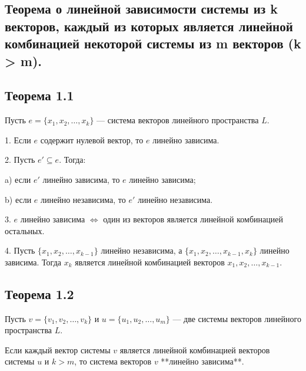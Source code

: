 {
\subsection{Теорема о линейной зависимости системы из k векторов, каждый из которых является линейной комбинацией некоторой системы из m векторов (k > m).}

\subsection*{Теорема 1.1}

Пусть \( e = \{ x_1, x_2, \ldots, x_k \} \) — система векторов линейного пространства \( L \).

1. Если \( e \) содержит нулевой вектор, то \( e \) линейно зависима.

2. Пусть \( e' \subseteq e \). Тогда:

   a) если \( e' \) линейно зависима, то \( e \) линейно зависима;
   
   b) если \( e \) линейно независима, то \( e' \) линейно независима.

3. \( e \) линейно зависима \( \iff \) один из векторов является линейной комбинацией остальных.

4. Пусть \( \{ x_1, x_2, \ldots, x_{k-1} \} \) линейно независима, а \( \{ x_1, x_2, \ldots, x_{k-1}, x_k \} \) линейно зависима. Тогда \( x_k \) является линейной комбинацией векторов \( x_1, x_2, \ldots, x_{k-1} \).


\subsection*{Теорема 1.2}

Пусть \( v = \{ v_1, v_2, \ldots, v_k \} \) и \( u = \{ u_1, u_2, \ldots, u_m \} \) — две системы векторов линейного пространства \( L \). 

Если каждый вектор системы \( v \) является линейной комбинацией векторов системы \( u \) и \( k > m \), то система векторов \( v \) **линейно зависима**.


}
